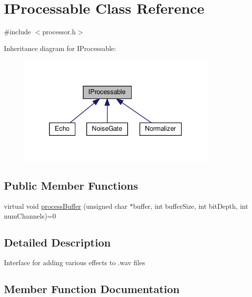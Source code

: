 \hypertarget{classIProcessable}{}\section{I\+Processable Class Reference}
\label{classIProcessable}


{\ttfamily \#include $<$processor.\+h$>$}



Inheritance diagram for I\+Processable\+:
\nopagebreak
\begin{figure}[H]
\begin{center}
\leavevmode
\includegraphics[width=283pt]{d5/dfc/classIProcessable__inherit__graph}
\end{center}
\end{figure}
\subsection*{Public Member Functions}
\begin{DoxyCompactItemize}
\item 
virtual void \hyperlink{classIProcessable_a818d23db44eefe70ef052c3ce9340f11}{process\+Buffer} (unsigned char $\ast$buffer, int buffer\+Size, int bit\+Depth, int num\+Channels)=0
\end{DoxyCompactItemize}


\subsection{Detailed Description}
Interface for adding various effects to .wav files 

\subsection{Member Function Documentation}
\mbox{\label{classIProcessable_a818d23db44eefe70ef052c3ce9340f11}} 
